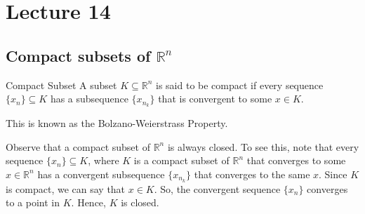 \documentclass[../Analysis-3.tex]{subfiles}
\begin{document}
\chapter*{Lecture 14} %
\setcounter{chapter}{14} %
\setcounter{section}{0}

\section{Compact subsets of $\mathbb{R}^n$}

\begin{Def}{Compact Subset}{}
  A subset $K \subseteq \mathbb{R}^n$ is said to be compact if every sequence $\{x_n\} \subseteq K$ has a subsequence $\{x_{n_k}\}$ that is convergent to some $x \in K$.
\end{Def}

This is known as the Bolzano-Weierstrass Property.

Observe that a compact subset of $\mathbb{R}^n$ is always closed. To see this, note that every sequence $\{x_n\} \subseteq K$, where $K$ is a compact subset of $\mathbb{R}^n$ that converges to some $x \in \mathbb{R}^n$ has a convergent subsequence $\{x_{n_k}\}$ that converges to the same $x$. Since $K$ is compact, we can say that $x \in K$. So, the convergent sequence $\{x_n\}$ converges to a point in $K$. Hence, $K$ is closed.
\end{document}
